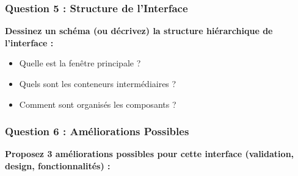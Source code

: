\documentclass[11pt,a4paper]{article}
\begin{document}
\begin{reponsebox}
\vspace{6cm}
\end{reponsebox}

\subsubsection{Question 5 : Structure de l'Interface}

\textbf{Dessinez un schéma (ou décrivez) la structure hiérarchique de l'interface :}
\begin{itemize}
    \item Quelle est la fenêtre principale ?
    \item Quels sont les conteneurs intermédiaires ?
    \item Comment sont organisés les composants ?
\end{itemize}

\begin{reponsebox}
\vspace{6cm}
\end{reponsebox}

\subsubsection{Question 6 : Améliorations Possibles}

\textbf{Proposez 3 améliorations possibles pour cette interface (validation, design, fonctionnalités) :}

\begin{reponsebox}
\vspace{5cm}
\end{reponsebox}
\end{document}
